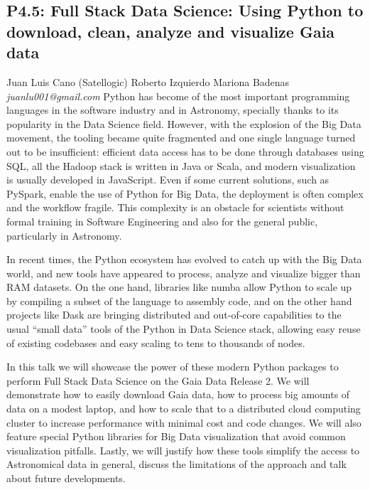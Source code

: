 \documentclass{report}
\begin{document}
\subsection*{P4.5: Full Stack Data Science: Using Python to download, clean, analyze and visualize Gaia data}
\bigskip
Juan Luis Cano (Satellogic) \newline Roberto Izquierdo  \newline  Mariona Badenas \newline   \newline  \newline  \newline\newline
{\it juanlu001@gmail.com}\newline
\newline\newline
Python has become of the most important programming languages in the software industry and in Astronomy, specially thanks to its popularity in the Data Science field. However, with the explosion of the Big Data movement, the tooling became quite fragmented and one single language turned out to be insufficient: efficient data access has to be done through databases using SQL, all the Hadoop stack is written in Java or Scala, and modern visualization is usually developed in JavaScript. Even if some current solutions, such as PySpark, enable the use of Python for Big Data, the deployment is often complex and the workflow fragile. This complexity is an obstacle for scientists without formal training in Software Engineering and also for the general public, particularly in Astronomy.

In recent times, the Python ecosystem has evolved to catch up with the Big Data world, and new tools have appeared to process, analyze and visualize bigger than RAM datasets. On the one hand, libraries like numba allow Python to scale up by compiling a subset of the language to assembly code, and on the other hand projects like Dask are bringing distributed and out-of-core capabilities to the usual “small data” tools of the Python in Data Science stack, allowing easy reuse of existing codebases and easy scaling to tens to thousands of nodes.

In this talk we will showcase the power of these modern Python packages to perform Full Stack Data Science on the Gaia Data Release 2. We will demonstrate how to easily download Gaia data, how to process big amounts of data on a modest laptop, and how to scale that to a distributed cloud computing cluster to increase performance with minimal cost and code changes. We will also feature special Python libraries for Big Data visualization that avoid common visualization pitfalls. Lastly, we will justify how these tools simplify the access to Astronomical data in general, discuss the limitations of the approach and talk about future developments.\newline
\newpage
\end{document}

